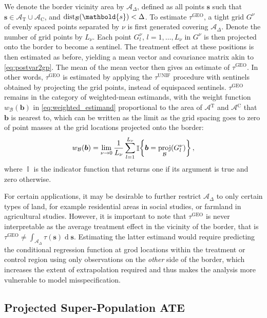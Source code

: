\documentclass[letter,12pt]{article}
\DeclarePairedDelimiter{\parenthesis}{\lparen}{\rparen}
\DeclarePairedDelimiter{\curlybracket}{\lbrace}{\rbrace}
\newcommand{\del}[1]{\parenthesis*{#1}}
\newcommand{\cbr}[1]{\curlybracket*{#1}}
\DeclareMathOperator{\dif}{d}
\DeclareMathOperator{\Ind}{\mathbb{I}}
\newcommand{\area}{\mathcal{A}}
\newcommand{\treat}{\mathrm{T}}
\newcommand{\ctrol}{\mathrm{C}}
\newcommand{\treatarea}{\area{}^{\treat}}
\newcommand{\ctrolarea}{\area{}^{\ctrol}}
\newcommand{\svec}{\mathbold{s}}
\newcommand{\border}{\mathcal{B}}
\newcommand{\sentinel}{\bm{b}}
\newcommand{\unifavg}{\tau^{\mathrm{UNIF}}}
\newcommand{\taugeo}{\tau^{\mathrm{GEO}}}
\DeclareMathOperator{\proj}{proj}
\DeclareMathOperator{\dist}{dist}
\newcommand{\buffer}{\Delta}
\newcommand{\weightb}{w_{\border}}
\newcommand{\gridres}{\nu}
\newcommand{\grid}{G^\gridres}
\begin{document}
We denote the border vicinity area by \(\area_\buffer\), defined as all points \(\svec\) such that \(\svec \in {\area_\treat \cup \area_\ctrol}\), and \(\dist_{\border}\del{\svec} < \buffer\).
To estimate \(\taugeo\), a tight grid \(\grid\) of evenly spaced points separated by \(\gridres\) is first generated covering \(\area_\buffer\).
Denote the number of grid points by \(L_\gridres\).
Each point \(\grid_l\), \(l=1,\dotsc,L_\gridres\) in \(\grid\) is then projected onto the border to become a sentinel.
The treatment effect at these positions is then estimated as before, yielding a mean vector and covariance matrix akin to \eqref{eq:postvar2gp}.
The mean of the mean vector then gives an estimate of \(\taugeo\).
In other words, \(\taugeo\) is estimated by applying the \(\unifavg\) procedure with sentinels obtained by projecting the grid points, instead of equispaced sentinels.
\(\taugeo\) remains in the category of weighted-mean estimands, with the weight function \(\weightb(\sentinel)\) in \eqref{eq:weighted_estimand} proportional to the area of \(\treatarea\) and \(\ctrolarea\) that \(\sentinel\) is nearest to, which can be written as the limit as the grid spacing goes to zero of point masses at the grid locations projected onto the border:
\begin{equation}
    \weightb(\sentinel) = \lim_{\gridres \rightarrow 0}\frac{1}{L_\gridres}\sum_{l=1}^{L_\gridres} \Ind\cbr{\sentinel = \proj_{\border}\del{\grid_l} }\,,
\end{equation}
where \(\Ind\) is the indicator function that returns one if its argument is true and zero otherwise.

For certain applications, it may be desirable to further restrict \(\area_\buffer\) to only certain types of land, for example residential areas in social studies, or farmland in agricultural studies.
However, it is important to note that \(\taugeo\) is never interpretable as the average treatment effect in the vicinity of the border, that is \(\taugeo \neq \int_{\area_\buffer} \tau(\svec) \dif \svec\).
Estimating the latter estimand would require predicting the conditional regression function at grod locations within the treatment or control region using only observations on the \emph{other} side of the border, which increases the extent of extrapolation required and thus makes the analysis more vulnerable to model misspecification.



\hypertarget{projected-super-population-ate}{%
\subsection{Projected Super-Population ATE}\label{projected-super-population-ate}}
\end{document}
